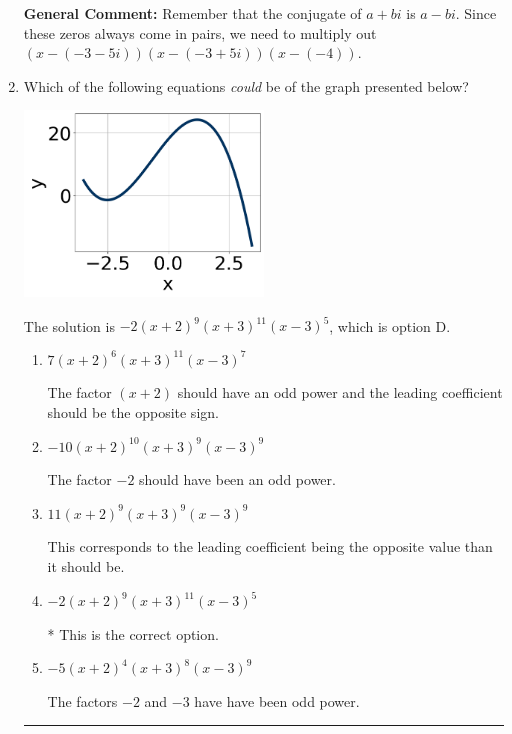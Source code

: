 \documentclass{extbook}[14pt]
\newcommand{\litem}[1]{\item #1

\rule{\textwidth}{0.4pt}}
\begin{document}
\begin{enumerate}
{\textbf{General Comment:} Remember that the conjugate of $a+bi$ is $a-bi$. Since these zeros always come in pairs, we need to multiply out $(x-(-3 - 5 i))(x-(-3 + 5 i))(x-(-4))$.
}
\litem{
Which of the following equations \textit{could} be of the graph presented below?

\begin{center}
    \includegraphics[width=0.5\textwidth]{../Figures/polyGraphToFunctionCopyC.png}
\end{center}


The solution is \( -2(x + 2)^{9} (x + 3)^{11} (x - 3)^{5} \), which is option D.\begin{enumerate}[label=\Alph*.]
\item \( 7(x + 2)^{6} (x + 3)^{11} (x - 3)^{7} \)

The factor $(x + 2)$ should have an odd power and the leading coefficient should be the opposite sign.
\item \( -10(x + 2)^{10} (x + 3)^{9} (x - 3)^{9} \)

The factor $-2$ should have been an odd power.
\item \( 11(x + 2)^{9} (x + 3)^{9} (x - 3)^{9} \)

This corresponds to the leading coefficient being the opposite value than it should be.
\item \( -2(x + 2)^{9} (x + 3)^{11} (x - 3)^{5} \)

* This is the correct option.
\item \( -5(x + 2)^{4} (x + 3)^{8} (x - 3)^{9} \)

The factors $-2$ and $-3$ have have been odd power.
\end{enumerate}

}
\end{enumerate}
\end{document}
